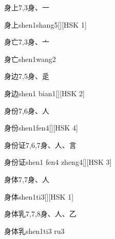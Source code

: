 \begin{entry}{身上}{7,3}{⾝、⼀}
  \begin{phonetics}{身上}{shen1shang5}[][HSK 1]
  \end{phonetics}
\end{entry}

\begin{entry}{身亡}{7,3}{⾝、⼇}
  \begin{phonetics}{身亡}{shen1wang2}
  \end{phonetics}
\end{entry}

\begin{entry}{身边}{7,5}{⾝、⾡}
  \begin{phonetics}{身边}{shen1 bian1}[][HSK 2]
  \end{phonetics}
\end{entry}

\begin{entry}{身份}{7,6}{⾝、⼈}
  \begin{phonetics}{身份}{shen1fen4}[][HSK 4]
  \end{phonetics}
\end{entry}

\begin{entry}{身份证}{7,6,7}{⾝、⼈、⾔}
  \begin{phonetics}{身份证}{shen1 fen4 zheng4}[][HSK 3]
  \end{phonetics}
\end{entry}

\begin{entry}{身体}{7,7}{⾝、⼈}
  \begin{phonetics}{身体}{shen1ti3}[][HSK 1]
  \end{phonetics}
\end{entry}

\begin{entry}{身体乳}{7,7,8}{⾝、⼈、⼄}
  \begin{phonetics}{身体乳}{shen1ti3 ru3}
  \end{phonetics}
\end{entry}

